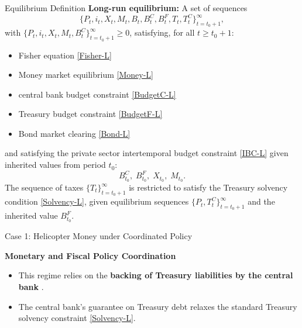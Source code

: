 \documentclass[11pt,aspectratio=169]{beamer}
\begin{document}
\begin{frame}{Equilibrium Definition}
\small
\textbf{Long-run equilibrium:}  
A set of sequences
\[
\{ P_t, i_t, X_t, M_t, B_t, B_t^C, B_t^F, T_t, T_t^C \}_{t=t_0+1}^\infty,
\]
with $\{ P_t, i_t, X_t, M_t, B_t^C \}_{t=t_0+1}^\infty \ge 0$, satisfying, for all $t \ge t_0+1$:
\begin{itemize}
  \item Fisher equation \eqref{Fisher-L}
  \item Money market equilibrium \eqref{Money-L}
  \item central bank  budget constraint \eqref{BudgetC-L}
  \item Treasury budget constraint \eqref{BudgetF-L}
  \item Bond market clearing \eqref{Bond-L}
\end{itemize}
and satisfying the private sector intertemporal budget constraint \eqref{IBC-L}
given inherited values from period $t_0$:
\[
B_{t_0}^C,\; B_{t_0}^F,\; X_{t_0},\; M_{t_0}.
\]
The sequence of taxes $\{T_t\}_{t=t_0+1}^\infty$ is restricted to satisfy the
Treasury solvency condition \eqref{Solvency-L}, given equilibrium sequences
$\{P_t, T_t^C\}_{t=t_0+1}^\infty$ and the inherited value $B_{t_0}^F$.
\end{frame}
\begin{frame}{Case 1: Helicopter Money under Coordinated Policy}

\textbf{Monetary and Fiscal Policy Coordination}
\vspace{1em}
\begin{itemize}
    \item This regime relies on the \textbf{backing of Treasury liabilities by the central bank }.
\vspace{1em}
    \item The central bank's guarantee on Treasury debt relaxes the standard Treasury solvency constraint \eqref{Solvency-L}.
\end{itemize}
\end{frame}
\end{document}
